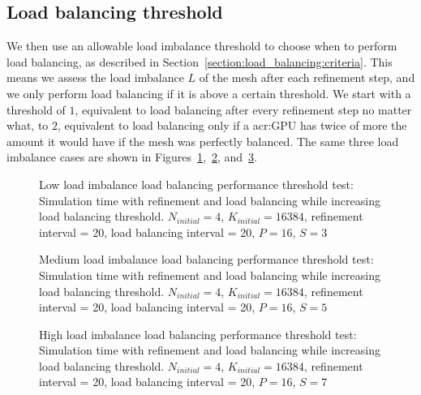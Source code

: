 \subsection{Load balancing threshold}\label{subsection:results:load_balancing_performance:threshold}

We then use an allowable load imbalance threshold to choose when to perform load balancing, as
described in Section~\ref{section:load_balancing:criteria}. This means we assess the load imbalance
\(L\) of the mesh after each refinement step, and we only perform load balancing if it is above a
certain threshold. We start with a threshold of \(1\), equivalent to load balancing after every
refinement step no matter what, to \(2\), equivalent to load balancing only if a \acrshort{acr:GPU}
has twice of more the amount it would have if the mesh was perfectly balanced. The same three load
imbalance cases are shown in
Figures~\ref{fig:load_balancing_efficiency_threshold_s3},~\ref{fig:load_balancing_efficiency_threshold_s5},
and~\ref{fig:load_balancing_efficiency_threshold_s7}.

\begin{figure}[H]
	\centering
	
	\caption{Low load imbalance load balancing performance threshold test: Simulation time with refinement and load balancing while increasing load balancing threshold. \(N_{initial} = 4\), \(K_{initial} = 16384\), refinement interval = 20, load balancing interval = 20, \(P = 16\), \(S = 3\)}\label{fig:load_balancing_efficiency_threshold_s3}
\end{figure}

\begin{figure}[H]
	\centering
	
	\caption{Medium load imbalance load balancing performance threshold test: Simulation time with refinement and load balancing while increasing load balancing threshold. \(N_{initial} = 4\), \(K_{initial} = 16384\), refinement interval = 20, load balancing interval = 20, \(P = 16\), \(S = 5\)}\label{fig:load_balancing_efficiency_threshold_s5}
\end{figure}

\begin{figure}[H]
	\centering
	
	\caption{High load imbalance load balancing performance threshold test: Simulation time with refinement and load balancing while increasing load balancing threshold. \(N_{initial} = 4\), \(K_{initial} = 16384\), refinement interval = 20, load balancing interval = 20, \(P = 16\), \(S = 7\)}\label{fig:load_balancing_efficiency_threshold_s7}
\end{figure}


